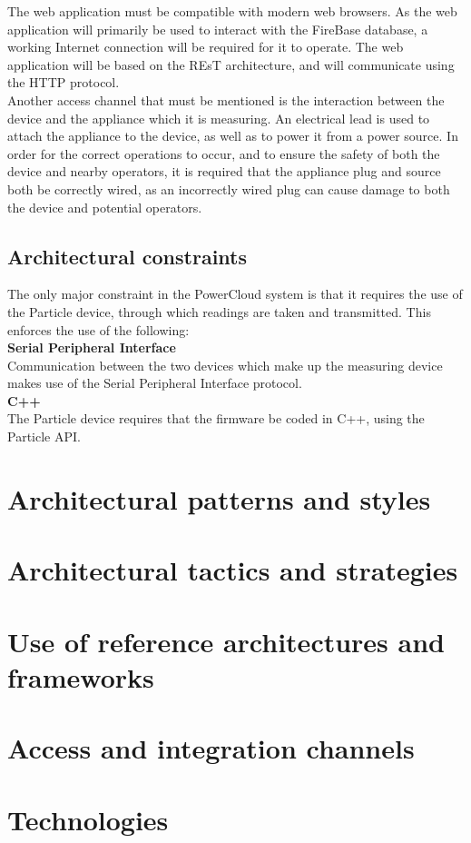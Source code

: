 \documentclass{article}
\begin{document}
	The web application must be compatible with modern web browsers. As the web application will primarily be used to interact with the FireBase database, a working Internet connection will be required for it to operate. The web application will be based on the REsT architecture, and will communicate using the HTTP protocol.\\
	
	Another access channel that must be mentioned is the interaction between the device and the appliance which it is measuring. An electrical lead is used to attach the appliance to the device, as well as to power it from a power source. In order for the correct operations to occur, and to ensure the safety of both the device and nearby operators, it is required that the appliance plug and source both be correctly wired, as an incorrectly wired plug can cause damage to both the device and potential operators.
	
	\subsection{Architectural constraints}
	
	The only major constraint in the PowerCloud system is that it requires the use of the Particle device, through which readings are taken and transmitted. This enforces the use of the following:\\
	
	\noindent\textbf{Serial Peripheral Interface}\\
	Communication between the two devices which make up the measuring device makes use of the Serial Peripheral Interface protocol.\\
	
	\noindent\textbf{C++}\\
	The Particle device requires that the firmware be coded in C++, using the Particle API.\\

\newpage

\section{Architectural patterns and styles}

\newpage

\section{Architectural tactics and strategies}

\newpage

\section{Use of reference architectures and frameworks}

\newpage

\section{Access and integration channels}

\newpage

\section{Technologies}
\end{document}

